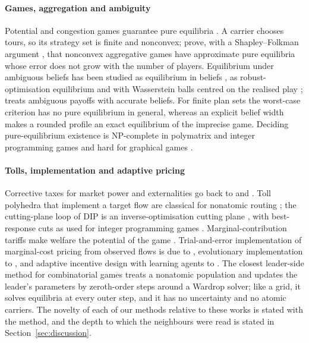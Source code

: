 \documentclass[preprint,11pt]{elsarticle}
\theoremstyle{definition}
\theoremstyle{remark}
\begin{document}
\paragraph{Games, aggregation and ambiguity} Potential and congestion games guarantee pure equilibria \citep{Rosenthal1973,Monderer1996}. A carrier chooses tours, so its strategy set is finite and nonconvex; \citet{Liu2023} prove, with a Shapley--Folkman argument \citep{Starr1969}, that nonconvex aggregative games have approximate pure equilibria whose error does not grow with the number of players. Equilibrium under ambiguous beliefs has been studied as equilibrium in beliefs \citep{Lo1996}, as robust-optimisation equilibrium \citep{Crespi2025} and with Wasserstein balls centred on the realised play \citep{Lanzetti2025,Feik2026}; \citet{Beauchene2016} treats ambiguous payoffs with accurate beliefs. For finite plan sets the worst-case criterion has no pure equilibrium in general, whereas an explicit belief width makes a rounded profile an exact equilibrium of the imprecise game. Deciding pure-equilibrium existence is NP-complete in polymatrix and integer programming games \citep{Apt2022,Carvalho2022} and hard for graphical games \citep{Gottlob2005}.

\paragraph{Tolls, implementation and adaptive pricing} Corrective taxes for market power and externalities go back to \citet{Buchanan1969} and \citet{Barnett1980}. Toll polyhedra that implement a target flow are classical for nonatomic routing \citep{Bergendorff1997}; the cutting-plane loop of DIP is an inverse-optimisation cutting plane \citep{Ahuja2001}, with best-response cuts as used for integer programming games \citep{Dragotto2023}. Marginal-contribution tariffs make welfare the potential of the game \citep{Wolpert2001,Marden2013}. Trial-and-error implementation of marginal-cost pricing from observed flows is due to \citet{Yang2004}, evolutionary implementation to \citet{Sandholm2002}, and adaptive incentive design with learning agents to \citet{Maheshwari2022,Maheshwari2026}. The closest leader-side method for combinatorial games \citep{Masiha2026} treats a nonatomic population and updates the leader's parameters by zeroth-order steps around a Wardrop solver; like a grid, it solves equilibria at every outer step, and it has no uncertainty and no atomic carriers. The novelty of each of our methods relative to these works is stated with the method, and the depth to which the neighbours were read is stated in Section~\ref{sec:discussion}.
\end{document}
